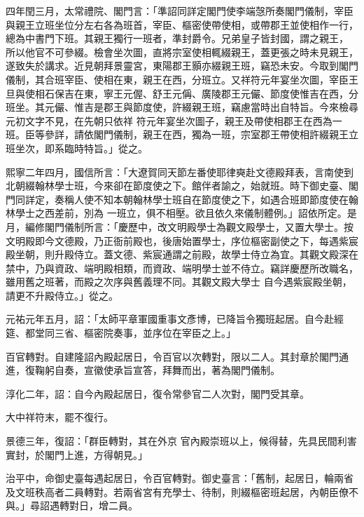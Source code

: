 \begin{pinyinscope}
 四年閏三月，太常禮院、閣門言：「準詔同詳定閣門使李端愨所奏閣門儀制，宰臣與親王立班坐位分左右各為班首，宰臣、樞密使帶使相，或帶郡王並使相作一行，總為中書門下班。其親王獨行一班者，準封爵令。兄弟皇子皆封國，謂之親王，
 所以他官不可參綴。檢會坐次圖，直將宗室使相輒綴親王，蓋更張之時未見親王，遂致失於講求。近見朝拜景靈宮，東陽郡王顥亦綴親王班，竊恐未安。今取到閣門儀制，其合班宰臣、使相在東，親王在西，分班立。又祥符元年宴坐次圖，宰臣王旦與使相石保吉在東，寧王元偓、舒王元偁、廣陵郡王元儼、節度使惟吉在西，分班坐。其元儼、惟吉是郡王與節度使，許綴親王班，竊慮當時出自特旨。今來檢尋元初文字不見，在先朝只依祥
 符元年宴坐次圖子，親王及帶使相郡王在西為一班。臣等參詳，請依閣門儀制，親王在西，獨為一班，宗室郡王帶使相許綴親王立班坐次，即系臨時特旨。」從之。



 熙寧二年四月，國信所言：「大遼賀同天節左番使耶律奭赴文德殿拜表，言南使到北朝綴翰林學士班，今來卻在節度使之下。館伴者諭之，始就班。時下御史臺、閣門同詳定，奏稱人使不知本朝翰林學士班自在節度使之下，如遇合班即節度使在翰林學士之西差前，別為
 一班立，俱不相壓。欲且依久來儀制體例。」詔依所定。是月，編修閣門儀制所言：「慶歷中，改文明殿學士為觀文殿學士，又置大學士。按文明殿即今文德殿，乃正衙前殿也，後唐始置學士，序位樞密副使之下，每遇紫宸殿坐朝，則升殿侍立。蓋文德、紫宸通謂之前殿，故學士侍立為宜。其觀文殿深在禁中，乃與資政、端明殿相類，而資政、端明學士並不侍立。竊詳慶歷所改職名，雖用舊之班著，而殿之次序與舊義理不同。其觀文殿大學士
 自今遇紫宸殿坐朝，請更不升殿侍立。」從之。



 元祐元年五月，詔：「太師平章軍國重事文彥博，已降旨令獨班起居。自今赴經筵、都堂同三省、樞密院奏事，並序位在宰臣之上。」



 百官轉對。自建隆詔內殿起居日，令百官以次轉對，限以二人。其封章於閣門通進，復鞠躬自奏，宣徽使承旨宣答，拜舞而出，著為閣門儀制。



 淳化二年，詔：自今內殿起居日，復令常參官二人次對，閣門受其章。



 大中祥符末，罷不復行。



 景德三年，復詔：「群臣轉對，其在外京
 官內殿崇班以上，候得替，先具民間利害實封，於閣門上進，方得朝見。」



 治平中，命御史臺每遇起居日，令百官轉對。御史臺言：「舊制，起居日，輪兩省及文班秩高者二員轉對。若兩省宮有充學士、待制，則綴樞密班起居，內朝臣僚不與。」尋詔遇轉對日，增二員。




\end{pinyinscope}
